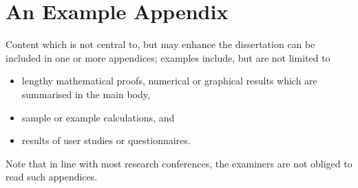 \documentclass[ %
                    author={Carlos Duran Calle},
                supervisor={Dr. Felipe Campelo},
                    degree={MSc},
                     title={Comparative Machine Learning Analysis for Student Dropout Prediction in a Virtual Learning Environment},
                  subtitle={Incorporating Student Engagement and Socio-Economic Features},
                      type={},
                      year={2025}]{dissertation}
\begin{document}
\backmatter

%




\appendix

\chapter{An Example Appendix}
\label{appx:example}

Content which is not central to, but may enhance the dissertation can be 
included in one or more appendices; examples include, but are not limited
to

\begin{itemize}
\item lengthy mathematical proofs, numerical or graphical results which 
      are summarised in the main body,
\item sample or example calculations, 
      and
\item results of user studies or questionnaires.
\end{itemize}

\noindent
Note that in line with most research conferences, the examiners are not
obliged to read such appendices.

\end{document}
